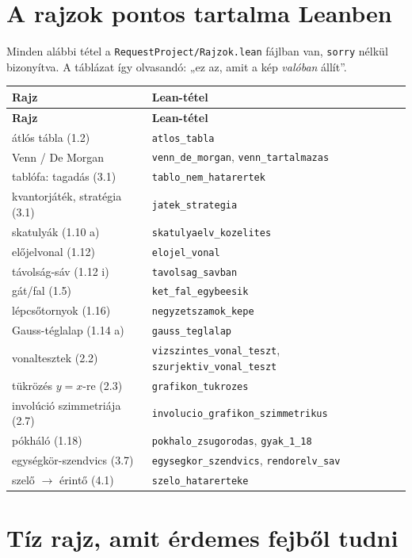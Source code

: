 \documentclass[11pt,a4paper]{article}
\newcommand{\lean}[1]{\texttt{\small #1}}
\theoremstyle{definition}
\begin{document}
\section{A rajzok pontos tartalma Leanben}

Minden alábbi tétel a \lean{RequestProject/Rajzok.lean} fájlban van, \lean{sorry} nélkül
bizonyítva. A táblázat így olvasandó: „ez az, amit a kép \emph{valóban} állít”.

\begingroup
\small
\begin{longtable}{@{}p{5.6cm}p{9.2cm}@{}}
\toprule
\textbf{Rajz} & \textbf{Lean-tétel} \\
\midrule
\endfirsthead
\toprule
\textbf{Rajz} & \textbf{Lean-tétel} \\
\midrule
\endhead
\bottomrule
\endfoot
átlós tábla (1.2) & \lean{atlos\_tabla} \\
Venn / De Morgan & \lean{venn\_de\_morgan}, \lean{venn\_tartalmazas} \\
tablófa: tagadás (3.1) & \lean{tablo\_nem\_hatarertek} \\
kvantorjáték, stratégia (3.1) & \lean{jatek\_strategia} \\
skatulyák (1.10 a) & \lean{skatulyaelv\_kozelites} \\
előjelvonal (1.12) & \lean{elojel\_vonal} \\
távolság-sáv (1.12 i) & \lean{tavolsag\_savban} \\
gát/fal (1.5) & \lean{ket\_fal\_egybeesik} \\
lépcsőtornyok (1.16) & \lean{negyzetszamok\_kepe} \\
Gauss-téglalap (1.14 a) & \lean{gauss\_teglalap} \\
vonaltesztek (2.2) & \lean{vizszintes\_vonal\_teszt}, \lean{szurjektiv\_vonal\_teszt} \\
tükrözés $y=x$-re (2.3) & \lean{grafikon\_tukrozes} \\
involúció szimmetriája (2.7) & \lean{involucio\_grafikon\_szimmetrikus} \\
pókháló (1.18) & \lean{pokhalo\_zsugorodas}, \lean{gyak\_1\_18} \\
egységkör-szendvics (3.7) & \lean{egysegkor\_szendvics}, \lean{rendorelv\_sav} \\
szelő $\to$ érintő (4.1) & \lean{szelo\_hatarerteke} \\
\end{longtable}
\endgroup

\section{Tíz rajz, amit érdemes fejből tudni}
\end{document}
